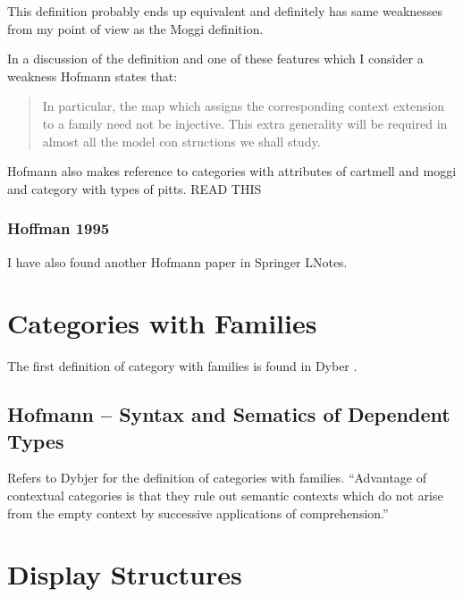 \documentclass[14pt,a4paper]{scrartcl}
\begin{document}
This definition probably ends up equivalent and definitely 
has same weaknesses from my point of view as the Moggi definition.

\noindent
In a discussion of the definition and one of these features which I consider a weakness Hofmann states that:
\begin{quote}
In particular, 
the map which assigns the corresponding context extension to a family need not 
be injective. This extra generality will be required in almost all the model con­ 
structions we shall study. 
\end{quote}

Hofmann also makes reference to categories with attributes of cartmell and moggi and category with types of pitts.
READ THIS 

\subsubsection{Hoffman 1995}
I have also found another Hofmann paper \cite{hofmann95} in Springer LNotes.

\section{Categories with Families}

The first definition of category with families is found in Dyber \cite{dybjer96}.

\subsection{Hofmann -- Syntax and Sematics of Dependent Types}
Refers to Dybjer \cite{dybjer96} for the definition of categories with families.
``Advantage of contextual categories is that they rule out semantic contexts which do not arise from the empty context by successive applications of comprehension.''

\section{Display Structures}
\end{document}
